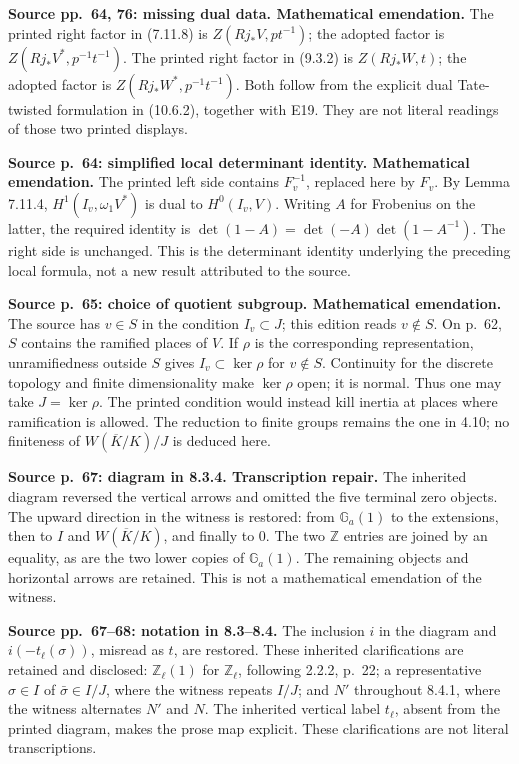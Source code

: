 \documentclass[10pt,letterpaper]{article}
\newcommand{\Z}{\mathbb Z}
\begin{document}
\begin{description}[style=nextline,leftmargin=2.6em,labelwidth=2.2em,font=\normalfont\bfseries]
\item[E20] \textbf{Source pp.~64, 76: missing dual data. Mathematical emendation.} The printed right factor in (7.11.8) is \(Z(Rj_*V,pt^{-1})\); the adopted factor is \(Z(Rj_*V^*,p^{-1}t^{-1})\). The printed right factor in (9.3.2) is \(Z(Rj_*W,t)\); the adopted factor is \(Z(Rj_*W^*,p^{-1}t^{-1})\). Both follow from the explicit dual Tate-twisted formulation in (10.6.2), together with E19. They are not literal readings of those two printed displays.

\item[E21] \textbf{Source p.~64: simplified local determinant identity. Mathematical emendation.} The printed left side contains \(F_v^{-1}\), replaced here by \(F_v\). By Lemma 7.11.4, \(H^1(I_v,\omega_1 V^*)\) is dual to \(H^0(I_v,V)\). Writing \(A\) for Frobenius on the latter, the required identity is \(\det(1-A)=\det(-A)\det(1-A^{-1})\). The right side is unchanged. This is the determinant identity underlying the preceding local formula, not a new result attributed to the source.
\item[E22] \textbf{Source p.~65: choice of quotient subgroup. Mathematical emendation.} The source has \(v\in S\) in the condition \(I_v\subset J\); this edition reads \(v\notin S\). On p.~62, \(S\) contains the ramified places of \(V\). If \(\rho\) is the corresponding representation, unramifiedness outside \(S\) gives \(I_v\subset\ker\rho\) for \(v\notin S\). Continuity for the discrete topology and finite dimensionality make \(\ker\rho\) open; it is normal. Thus one may take \(J=\ker\rho\). The printed condition would instead kill inertia at places where ramification is allowed. The reduction to finite groups remains the one in 4.10; no finiteness of \(W(\overline K/K)/J\) is deduced here.
\item[E23] \textbf{Source p.~67: diagram in 8.3.4. Transcription repair.} The inherited diagram reversed the vertical arrows and omitted the five terminal zero objects. The upward direction in the witness is restored: from \(\mathbb G_a(1)\) to the extensions, then to \(I\) and \(W(\overline K/K)\), and finally to \(0\). The two \(\Z\) entries are joined by an equality, as are the two lower copies of \(\mathbb G_a(1)\). The remaining objects and horizontal arrows are retained. This is not a mathematical emendation of the witness.
\item[E24] \textbf{Source pp.~67--68: notation in 8.3--8.4.} The inclusion \(i\) in the diagram and \(i(-t_\ell(\sigma))\), misread as \(t\), are restored. These inherited clarifications are retained and disclosed: \(\mathbb Z_\ell(1)\) for \(\mathbb Z_\ell\), following 2.2.2, p.~22; a representative \(\sigma\in I\) of \(\bar\sigma\in I/J\), where the witness repeats \(I/J\); and \(N'\) throughout 8.4.1, where the witness alternates \(N'\) and \(N\). The inherited vertical label \(t_\ell\), absent from the printed diagram, makes the prose map explicit. These clarifications are not literal transcriptions.

\end{description}
\end{document}
